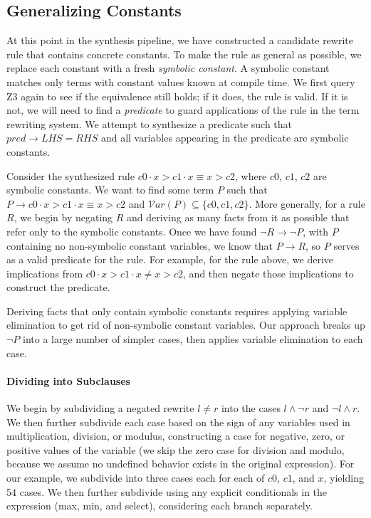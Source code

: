 \documentclass[sigplan,10pt,review,anonymous]{acmart}\settopmatter{printfolios=true,printccs=false,printacmref=false}
\begin{document}
\subsection{Generalizing Constants}

At this point in the synthesis pipeline, we have constructed a candidate rewrite
rule that contains concrete constants.  To make the rule as general as possible,
we replace each constant with a fresh \emph{symbolic constant}. A symbolic constant
 matches only terms with constant values known at compile time. We first query Z3
again to see if the equivalence still holds; if it does, the rule is valid. If
it is not, we will need to find a \textit{predicate} to guard
applications of the rule in the term rewriting system. We attempt to synthesize a predicate
such that $pred \rightarrow LHS = RHS$ and all variables appearing in the
predicate are symbolic constants.

Consider the synthesized rule $c0 \cdot x > c1 \cdot x \equiv x > c2$, where $c0$, $c1$,
$c2$ are symbolic constants. We want to find some term $P$ such that
$P \rightarrow c0 \cdot x > c1 \cdot x \equiv x > c2$ and
$\mathcal{V}ar(P) \subseteq \{c0, c1, c2\}$. More generally, for a rule $R$, we begin by
negating $R$ and deriving as many facts from it as possible that refer only to
the symbolic constants. Once we have found $\neg R \rightarrow \neg P$, with $P$ containing
no non-symbolic constant variables, we know that $P \rightarrow R$, so $P$ serves as a
valid predicate for the rule.  For example, for the rule above, we derive implications
from $c0 \cdot x > c1 \cdot x \neq x > c2$, and then negate those implications to
construct the predicate.

Deriving facts that only contain symbolic constants requires applying variable
elimination to get rid of non-symbolic constant variables.  Our approach breaks up $\neg P$ into
a large number of simpler cases, then applies variable elimination to each case.

\paragraph{Dividing into Subclauses} We begin by subdividing a negated rewrite $l \neq r$ into
the cases $l \wedge \neg r$ and $\neg l \wedge r$.  We then further subdivide each case based
on the sign of any variables used in multiplication, division, or modulus, constructing
a case for negative, zero, or positive values of the variable (we skip the zero case for
division and modulo, because we assume no undefined behavior exists in the original expression).
For our example, we subdivide into three cases each for each of $c0$, $c1$, and $x$, yielding
54 cases.  We then further subdivide using any explicit conditionals in the expression (max,
min, and select), considering each branch separately.
\end{document}
